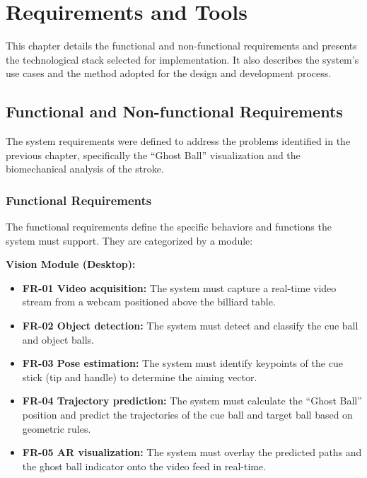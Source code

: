 \chapter{Requirements and Tools}

This chapter details the functional and non-functional requirements and presents the technological stack selected for implementation. It also describes the system's use cases and the method adopted for the design and development process.

\section{Functional and Non-functional Requirements}

The system requirements were defined to address the problems identified in the previous chapter, specifically the ``Ghost Ball'' visualization and the biomechanical analysis of the stroke.

\subsection{Functional Requirements}
The functional requirements define the specific behaviors and functions the system must support. They are categorized by a module:

\textbf{Vision Module (Desktop):}
\begin{itemize}
    \item \textbf{FR-01 Video acquisition:} The system must capture a real-time video stream from a webcam positioned above the billiard table.
    \item \textbf{FR-02 Object detection:} The system must detect and classify the cue ball and object balls.
    \item \textbf{FR-03 Pose estimation:} The system must identify keypoints of the cue stick (tip and handle) to determine the aiming vector.
    \item \textbf{FR-04 Trajectory prediction:} The system must calculate the ``Ghost Ball'' position and predict the trajectories of the cue ball and target ball based on geometric rules.
    \item \textbf{FR-05 AR visualization:} The system must overlay the predicted paths and the ghost ball indicator onto the video feed in real-time.
\end{itemize}

